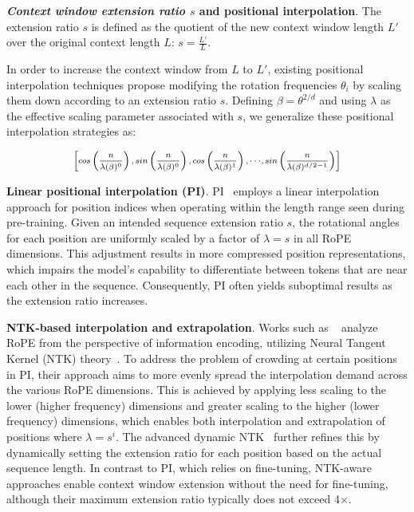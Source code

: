 \textbf{\emph{Context window extension ratio $s$} and positional interpolation}. The extension ratio $s$ is defined as the quotient of the new context window length $L'$ over the original context length $L$: $s = \frac{L'}{L}$.

In order to increase the context window from $L$ to $L'$, existing positional interpolation techniques propose modifying the rotation frequencies $\theta_i$ by scaling them down according to an extension ratio $s$. Defining $\beta=\theta^{2/d}$ and using $\lambda$ as the effective scaling parameter associated with $s$, we generalize these positional interpolation strategies as:

\begin{equation}	
	\fontsize{7.5}{7.5} \selectfont
	\label{eq:unified_rope}
	\begin{aligned}
		\left[cos\left(\frac{n}{\lambda(\beta)^0}\right), sin \left(\frac{n}{\lambda(\beta)^0}\right), cos\left(\frac{n}{\lambda(\beta)^1}\right), \cdot\cdot\cdot,  sin \left(\frac{n}{\lambda(\beta)^{d/2-1}}\right) \right]   
	\end{aligned}
\end{equation}

\textbf{Linear positional interpolation (PI)}. PI~\cite{pi} employs a linear interpolation approach for position indices when operating within the length range seen during pre-training. Given an intended sequence extension ratio $s$, the rotational angles for each position are uniformly scaled by a factor of $\lambda = s$ in all RoPE dimensions. This adjustment results in more compressed position representations, which impairs the model's capability to differentiate between tokens that are near each other in the sequence. Consequently, PI often yields suboptimal results as the extension ratio increases.

\textbf{NTK-based interpolation and extrapolation}. Works such as ~\cite{ntk,dynamicntk} analyze RoPE from the perspective of information encoding, utilizing Neural Tangent Kernel (NTK) theory~\cite{jacot2018neural,tancik2020fourier}. To address the problem of crowding at certain positions in PI, their approach aims to more evenly spread the interpolation demand across the various RoPE dimensions. This is achieved by applying less scaling to the lower (higher frequency) dimensions and greater scaling to the higher (lower frequency) dimensions, which enables both interpolation and extrapolation of positions where $\lambda=s^{i}$. The advanced dynamic NTK~\cite{dynamicntk} further refines this by dynamically setting the extension ratio for each position based on the actual sequence length. In contrast to PI, which relies on fine-tuning, NTK-aware approaches enable context window extension without the need for fine-tuning, although their maximum extension ratio typically does not exceed 4$\times$.

